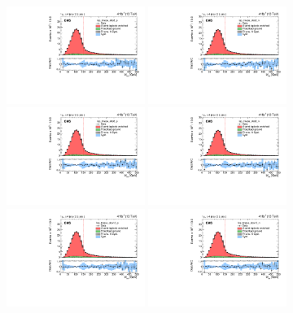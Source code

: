 \begin{figure}
    \centering
    \includegraphics[width=0.4\textwidth]{figure/FitResult_17_mu_lep_tmass_obs3_p_chi2_20.pdf}
    \includegraphics[width=0.4\textwidth]{figure/FitResult_17_mu_lep_tmass_obs3_n_chi2_20.pdf}
    \includegraphics[width=0.4\textwidth]{figure/FitResult_17_mu_lep_tmass_obs6_p_chi2_20.pdf}
    \includegraphics[width=0.4\textwidth]{figure/FitResult_17_mu_lep_tmass_obs6_n_chi2_20.pdf}
    \includegraphics[width=0.4\textwidth]{figure/FitResult_17_mu_lep_tmass_obs12_p_chi2_20.pdf}
    \includegraphics[width=0.4\textwidth]{figure/FitResult_17_mu_lep_tmass_obs12_n_chi2_20.pdf}

\end{figure}

